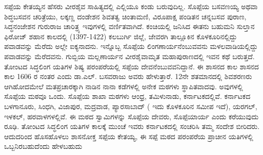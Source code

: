 ಸಪ್ಪೆಯ ಕೇತಯ್ಯನ ಹೆಸರು ವೀರಶೈವ ಸಾಹಿತ್ಯದಲ್ಲಿ ಎಲ್ಲಿಯೂ ಕಂಡು ಬರುವುದಿಲ್ಲ. ಸೊಪ್ಪೆಯ ಬಸವಣಯ್ಯ ಅಥವಾ ಶಿದ್ಧಬಸವನ ಚರಿತ್ರೆಯು, ಲಕ್ಕಣ್ಣ ದಂಡೇಶನ ಶಿವತತ್ವ ಚಿಂತಾಮಣಿ, ವಿರೂಪಾಕ್ಷ ಪಂಡಿತನ ಚನ್ನಬಸವ ಪುರಾಣ, ಸಿದ್ಧನಂಜೇಶನ ಗುರುರಾಜ ಚಾರಿತ್ರ್ಯ ಇವುಗಳಲ್ಲಿ ವರ್ಣಿತವಾಗಿದೆ. ಕಂಚಿಯಲ್ಲಿ ಜನಿಸಿದ ಈತನು ಬಹುಮನಿ ಸುಲ್ತಾನ ಫಿರೋಜ್​ ಶಹಾನ ಕಾಲದಲ್ಲಿ (1397-1422) ಕಲಬುರ್ಗಿ ಜಿಲ್ಲೆ, ಜೇವರಗಿ ತಾಲ್ಲೂಕಿನ ಕೊಳಕೂರಿನಲ್ಲಿದ್ದು ಪವಾಡವನ್ನು ಮೆರೆದು ಅಲ್ಲೇ ಐಕ್ಯನಾದನು. ಇನ್ನೊಬ್ಬ ಸೊಪ್ಪೆಯ ಲಿಂಗಣಾರ್ಯನೆಂಬುವವನು ಮಳಲವಾಡಿಯಲ್ಲಿದ್ದು ಪವಾಡವನ್ನು ಮೆರೆದವನು. ಗುಬ್ಬಿಯ ಮಲ್ಲಣಾರ್ಯನ ವೀರಶೈವಾಮೃತ ಮಹಾಪುರಾಣದಲ್ಲಿ ಇವನ ಕಥೆ ಬರುತ್ತದೆ. ತೋಂಟದ ಸಿದ್ಧಲಿಂಗ ಯತಿಗಳ ಶಿಷ್ಯ ಪರಂಪರೆಯಲ್ಲಿ ಸಪ್ಪೆಯ ದೇವನೆಂಬುವವನಿದ್ದಾನೆ. ಈ ಶಾಸನದ ಕಾಲ ಶಾಸನದ ಕಾಲ 1606 ರ ನಂತರ ಎಂದು ಡಾ.ಎಲ್​. ಬಸವರಾಜು ಅವರು ಹೇಳುತ್ತಾರೆ. 12ನೇ ಶತಮಾನದಲ್ಲಿ ಶಿವಶರಣರು ಆಗಿಹೋದಮೇಲೆ ಮತಪ್ರಚಾರಕ್ಕಾಗಿ ನಾಡಿನ ನಾನಾ ಕಡೆಗಳಲ್ಲಿ ಅನೇಕ ಮಠಗಳು ಸ್ಥಾಪಿತವಾದವು. ಅವುಗಳಲ್ಲಿ ಸೊಪ್ಪೆಯ ಮಠವೂ ಒಂದು. ಸೊಪ್ಪೆಯ ಶಾಖಾ ಮಠಗಳು ಆಂಧ್ರ, ತಮಿಳುನಾಡು, ಕರ್ನಾಟಕದಲ್ಲಿವೆ. ಕರ್ನಾಟಕದ ಬಳಗಾನೂರು, ಸಿಂಧಗಿ, ವಿಜಾಪುರ, ಮದ್ರವಾಡ, ಪ್ಯಾರಸಾಬಾದ್​ ( ಇದು ಕೊಳಕೂರಿನ ಸಮೀಪ ಇದೆ), ಯರಗಲ್​, ಇಳಕಲ್​, ಹರವಾಳಗಳಲ್ಲಿವೆ. ಈ ಮಠದ ಸ್ವಾಮಿಗಳನ್ನು ಸೊಪ್ಪೆಯ ದೇವರು, ಸೊಪ್ಪೆಯಾರ್ಯ ಎಂದು ಕರೆಯುವುದು ರೂಢಿ. ತೋಂಟದ ಸಿದ್ಧಲಿಂಗ ಯತಿಗಳ ಕಾಲಕ್ಕೆ ಮುಂಚೆ ಇವರು ಕರ್ನಾಟಕದಲ್ಲಿ ಸಂಚರಿಸಿ ತಮ್ಮ ಸಂದೇಶ ಬೀರಿದರು. ಆದುದರಿಂದ ಹೊಸಹೊಳಲು ಶಾಸನೋಕ್ತ ಸಪ್ಪೆಯ ಕೇತಯ್ಯ, ಈ ಸಪ್ಪೆ ಮಠದ ಪರಂಪರೆಯ ಪ್ರಾಚೀನ ಯತಿಗಳಲ್ಲಿ ಒಬ್ಬನಿರಬಹುದೆಂದು ಹೇಳಬಹುದು

